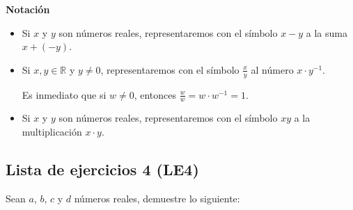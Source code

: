 \documentclass[11pt]{article}
\newcommand{\R}{\mathbb{R}}
\begin{document}
\textbf{Notación}
\begin{itemize}
\item Si $x$ y $y$ son números reales, representaremos con el símbolo $x-y$ a la suma $x+(-y)$.
\item Si $x,y\in \R$ y $y\neq 0$, representaremos con el símbolo $ \frac{x}{y}$ al número $x \cdot y^{-1}$.

Es inmediato que si $w\neq 0$, entonces $\frac{w}{w} = w\cdot w^{-1} = 1$.

\item Si $x$ y $y$ son números reales, representaremos con el símbolo $xy$ a la multiplicación $x\cdot y$.
\end{itemize}

\subsection*{Lista de ejercicios 4 (LE4)}

Sean $a$, $b$, $c$ y $d$ números reales, demuestre lo siguiente:
\end{document}
